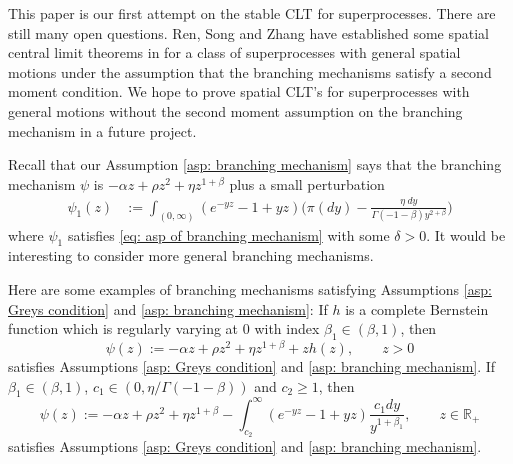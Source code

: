 \documentclass[12pt,a4paper]{amsart}
\theoremstyle{plain}
\theoremstyle{definition}
\numberwithin{equation}{section}
\begin{document}
    This paper is our first attempt on the stable CLT for superprocesses.
    There are still many open questions.
    Ren, Song and Zhang have established some spatial  central limit theorems in
 \cite{RenSongZhang2015Central} 
	for a class of superprocesses with general spatial motions under the assumption that the branching mechanisms satisfy a second moment condition.
	We hope to prove spatial CLT's for superprocesses with general motions without the second moment assumption on the branching mechanism in a future project.


    Recall that our Assumption \ref{asp: branching mechanism} says that the branching mechanism $\psi$ is $-\alpha z + \rho z^2+\eta z^{1+\beta}$ plus a small perturbation
\begin{align}
\label{eq: psi 1}
	\psi_1(z)
	&:= \int_{(0,\infty)}(e^{-yz}-1+yz) \Big(\pi(dy) - \frac{\eta~dy}{\Gamma(-1-\beta)y^{2+\beta}}\Big)
\end{align}
    where $\psi_1$ satisfies \eqref{eq: asp of branching mechanism} with some $\delta>0$.
    It would be interesting to consider more general branching mechanisms.


Here are some examples of branching mechanisms satisfying Assumptions \ref{asp: Greys condition} and \ref{asp: branching mechanism}:
    If $h$ is a complete Bernstein function which is regularly varying at 0 with index
$\beta_1\in (\beta, 1)$, then
$$
    \psi(z):=-\alpha z + \rho z^2+\eta z^{1+\beta}+zh(z), \qquad z>0
$$
satisfies Assumptions \ref{asp: Greys condition} and \ref{asp: branching mechanism}.
If $\beta_1\in (\beta, 1)$, $c_1\in (0, \eta/\Gamma(-1-\beta))$ and $c_2\ge 1$, then
$$
\psi(z):=-\alpha z + \rho z^2+\eta z^{1+\beta}-\int^\infty_{c_2}
(e^{-yz}-1+yz)\frac{c_1dy}{y^{1+\beta_1}}, \qquad z\in \mathbb R_+
$$
satisfies Assumptions \ref{asp: Greys condition} and \ref{asp: branching mechanism}.
\end{document}
